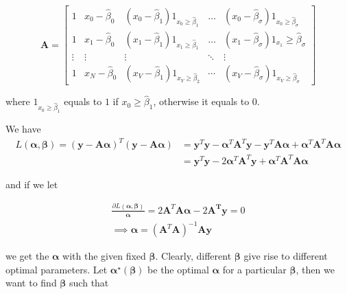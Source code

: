 $$
\boldsymbol{A}=\left[\begin{array}{ccccc}
1 & x_{0}-\hat{\beta}_{0} & \left(x_{0}-\hat{\beta}_{1}\right) 1_{x_{0} \geq \hat{\beta}_{1}} & \ldots & \left(x_{0}-\hat{\beta}_{\sigma}\right) 1_{x_{0} \geq \hat{\beta}_{\sigma}} \\
1 & x_{1}-\hat{\beta}_{0} & \left(x_{1}-\hat{\beta}_{1}\right) 1_{x_{1} \geq \hat{\beta}_{1}} & \ldots & \left(x_{1}-\hat{\beta}_{\sigma}\right) 1_{x_{1}} \geq \hat{\beta}_{\sigma} \\
\vdots & \vdots & \vdots & \ddots & \vdots \\
1 & x_{N}-\hat{\beta}_{0} & \left(x_{V}-\hat{\beta}_{1}\right) 1_{x_{V} \geq \hat{\beta}_{2}} & \cdots & \left(x_{V}-\hat{\beta}_{\sigma}\right) 1_{x_{V} \geq \hat{\beta}_{\sigma}}
\end{array}\right]$$

where $1_{x_{0} \geq \hat{\beta}_{1}}$ equals to $1$ if ${x_{0} \geq \hat{\beta}_{1}}$, otherwise it equals to $0$.

We have
\begin{equation}
 \begin{split}
	L(\boldsymbol{\alpha},\boldsymbol{\beta}) 
	 =(\boldsymbol{y-A\alpha})^T(\boldsymbol{y-A\alpha}) 
	&=\boldsymbol{y}^T\boldsymbol{y}-\boldsymbol{\alpha}{^T}\boldsymbol{A}^T\boldsymbol{y}-\boldsymbol{y}^T\boldsymbol{A\alpha}+\boldsymbol{\alpha}^T\boldsymbol{A}^T\boldsymbol{A\alpha} \\
	& = \boldsymbol{y}^T\boldsymbol{y}-2\boldsymbol{\alpha}^T\boldsymbol{A}^T\boldsymbol{y}+\boldsymbol{\alpha}^T\boldsymbol{A}^T\boldsymbol{A}\boldsymbol{\alpha}
\end{split}
\end{equation}

and if we let 

\begin{equation}
\label{alpha_form}
	\begin{split}
		\frac{\partial L(\boldsymbol{\alpha}, \boldsymbol{\beta})}{\boldsymbol{\alpha}}=2\boldsymbol{A}^T\boldsymbol{A}\boldsymbol{\alpha}-2\boldsymbol{A^T}\boldsymbol{y}=0 \\ \implies 
		\boldsymbol{\alpha}=(\boldsymbol{A}^T\boldsymbol{A})^{-1}\boldsymbol{A}\boldsymbol{y}
	\end{split}
\end{equation}


we get the $\boldsymbol{\alpha}$ with the given fixed $\boldsymbol{\beta}$. Clearly, different $\boldsymbol{\beta}$ give rise to different optimal parameters. Let $\boldsymbol{\alpha^\star}(\boldsymbol{\beta})$ be the optimal $\boldsymbol{\alpha}$ for a particular $\boldsymbol{\beta}$, then we want to find $\boldsymbol{\beta}$ such that


